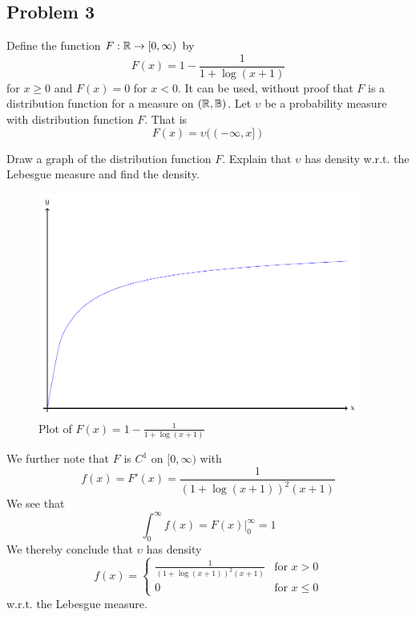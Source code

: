 \subsection{Problem 3} %
\label{sub:problem_3 2013}
Define the function \(F:{\mathbb{R}} \rightarrow[0,\infty)\) by
\[
	F(x)=1-\frac{1}{1+\log(x+1)}
\]
for \(x\geq0\) and \(F(x)=0\) for \(x<0\). It can be used, without proof that \(F\) is a distribution function for a measure on \(({\mathbb{R}},{\mathbb{B}})\). Let \(\upsilon\) be a probability measure with distribution function \(F\). That is
\[
	F(x)=\upsilon((-\infty,x])
\]
\begin{problem}
Draw a graph of the distribution function \(F\). Explain that \(\upsilon\) has density w.r.t. the  Lebesgue measure and find the density.
\end{problem}
\begin{solution}
\begin{figure}[htbp]
	\centering
	\includegraphics[width=0.95\textwidth]{fig/exam-2013.pdf}
	\caption{Plot of \(\displaystyle F(x)=1-\frac{1}{1+\log(x+1)}\) }
\end{figure}
We further note that \(F\) is \(C^1\) on \([0,\infty)\) with
\[
	f(x)=F'(x)=\frac{1}{(1+\log(x+1))^2(x+1)}
\]
We see that
\[
	\int_0^\infty f(x)=F(x)\Big|_0^\infty = 1
\]
We thereby conclude that \(\upsilon\) has density
\[
	f(x)=\left\{
	\begin{matrix}
	\frac{1}{(1+\log(x+1))^2(x+1)} &  \text{for } x>0 \\
	0 &  \text{for } x\leq0
	\end{matrix}
	\right.
\]
w.r.t. the Lebesgue measure.
\end{solution}
